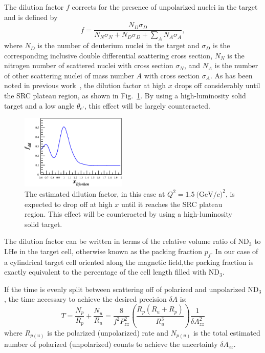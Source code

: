 The dilution factor $f$ corrects for the presence of unpolarized nuclei in the target and is defined by
\begin{equation}
f=\frac{N_D\sigma_D}{N_N\sigma_N+N_D\sigma_D+\sum\limits_{A} N_A\sigma_A},
\end{equation}
where $N_D$ is the number of deuterium nuclei in the target and $\sigma_D$ is the corresponding inclusive double differential scattering cross 
section, $N_N$ is the nitrogen number of scattered nuclei with cross section $\sigma_N$, and $N_A$ is the number of other scattering nuclei of mass number $A$ with cross section $\sigma_A$. As has been noted in previous work~\cite{Frankfurt:1988nt}, the dilution factor at high $x$ drops off considerably until the SRC plateau region, as shown in Fig.~\ref{fdil}. By using a high-luminosity solid target and a low angle $\theta_{e'}$, this effect will be largely counteracted.

\begin{figure}
\begin{center}
\includegraphics[width=0.45\textwidth]{figs/fdil_q2_15.eps}
\caption{\label{fdil}The estimated dilution factor, in this case at $Q^2=1.5 \mathrm{~(GeV}/c)^2$, is expected to drop off at high $x$ until it reaches the SRC plateau region. This effect will be counteracted by using a high-luminosity solid target.}
\end{center}
\end{figure}


The dilution factor can be written in terms of the relative volume ratio of ND$_3$ to LHe in the target cell, otherwise known as the packing fraction $p_f$.  
In our case of a cylindrical target cell oriented along the magnetic field,the packing fraction is exactly equivalent to the percentage of the cell length filled with ND$_3$.  

If the time is evenly split between scattering off of polarized and unpolarized ND$_3$, the time necessary to achieve the desired precision $\delta A$ is:
\begin{equation}
T=\frac{N_p}{R_p}+\frac{N_u}{R_u}=\frac{8}{f^2P_{zz}^2}\left(\frac{R_p(R_u+R_p)}{R_u^3}\right)\frac{1}{\delta A_{zz}^2}
\end{equation} 
where $R_{p(u)}$ is the polarized (unpolarized) rate and $N_{p(u)}$ is the total estimated 
number of polarized (unpolarized) counts to achieve the uncertainty $\delta A_{zz}$.  

